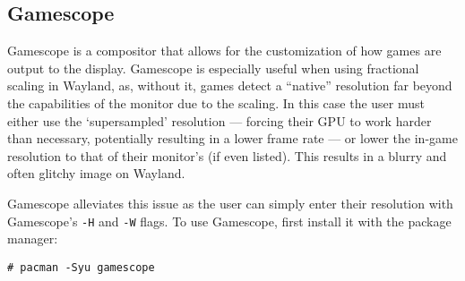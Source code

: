 \documentclass[a4paper]{article}
\begin{document}
\subsection{Gamescope}

Gamescope is a compositor that allows for the customization of how games are output to the display.
Gamescope is especially useful when using fractional scaling in Wayland, as, without it, games detect a ``native'' resolution far beyond the capabilities of the monitor due to the scaling.
In this case the user must either use the `supersampled' resolution --- forcing their GPU to work harder than necessary, potentially resulting in a lower frame rate --- or lower the in-game resolution to that of their monitor's (if even listed).
This results in a blurry and often glitchy image on Wayland.

Gamescope alleviates this issue as the user can simply enter their resolution with Gamescope's \lstinline|-H| and \lstinline|-W| flags.
To use Gamescope, first install it with the package manager:
\begin{lstlisting}
# pacman -Syu gamescope
\end{lstlisting}
\end{document}
